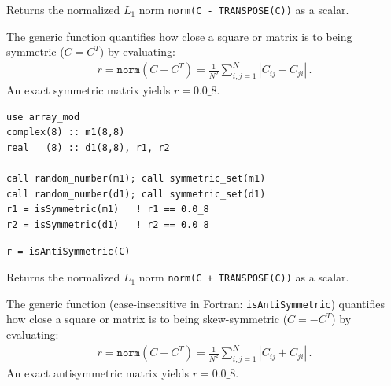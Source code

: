 Returns the normalized $L_1$ norm \texttt{norm(C - TRANSPOSE(C))} as a  scalar.

The generic function  quantifies how close a square  or  matrix  is to being symmetric ($C = C^T$) by evaluating:
\begin{align}
  r = \texttt{norm}(C - C^T) = \frac{1}{N^2}\sum_{i,j=1}^{N} \left|C_{ij} - C_{ji}\right|\, .
\end{align}
An exact symmetric matrix yields $r = 0.0\_8$.

\begin{description}[leftmargin=2.2cm, style=nextline]
\end{description}

\lstset{language=[95]Fortran}
\begin{lstlisting}
use array_mod
complex(8) :: m1(8,8)
real   (8) :: d1(8,8), r1, r2

call random_number(m1); call symmetric_set(m1)
call random_number(d1); call symmetric_set(d1)
r1 = isSymmetric(m1)   ! r1 == 0.0_8
r2 = isSymmetric(d1)   ! r2 == 0.0_8
\end{lstlisting}


\lstset{language=[95]Fortran}
\begin{lstlisting}
r = isAntiSymmetric(C)
\end{lstlisting}

Returns the normalized $L_1$ norm \texttt{norm(C + TRANSPOSE(C))} as a  scalar.

The generic function  (case-insensitive in Fortran: \texttt{isAntiSymmetric}) quantifies how close a square  or  matrix  is to being skew-symmetric ($C = -C^T$) by evaluating:
\begin{align}
  r = \texttt{norm}(C + C^T) = \frac{1}{N^2}\sum_{i,j=1}^{N} \left|C_{ij} + C_{ji}\right|\, .
\end{align}
An exact antisymmetric matrix yields $r = 0.0\_8$.

